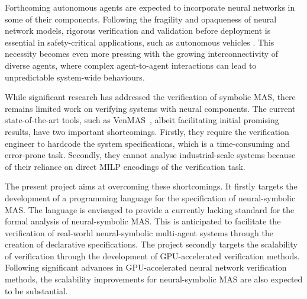 \documentclass[11pt]{article}
\begin{document}
Forthcoming autonomous agents are expected to incorporate
neural networks in some of their components. Following the
fragility and opaqueness of neural network models, rigorous
verification and validation before deployment is essential
in safety-critical applications, such as autonomous
vehicles \cite{Badue+21}. This necessity becomes even more pressing with the
growing interconnectivity of diverse agents, where complex
agent-to-agent interactions can lead to unpredictable
system-wide behaviours.

While significant research has addressed the verification of
symbolic MAS, there remains limited work on
verifying systems with neural components. The current
state-of-the-art tools,  such as {\sc
VenMAS}~\cite{Akintunde+20}, albeit facilitating initial
promising results, have two important shortcomings. Firstly,
they require the verification engineer to  hardcode the
system specifications, which is a time-consuming and
error-prone task. Secondly, they cannot analyse
industrial-scale systems because of their reliance on direct
MILP encodings of the verification task. 

The present project aims at overcoming these shortcomings.
It firstly targets the development of a programming language
for the specification of neural-symbolic MAS. The language
is envisaged to provide a currently lacking standard for the
formal analysis of neural-symbolic MAS. This is anticipated
to facilitate the verification of real-world neural-symbolic
multi-agent systems through the creation of declarative
specifications. The project secondly targets the scalability
of verification through the development of GPU-accelerated
verification methods. Following significant advances in
GPU-accelerated neural network verification methods, 
the scalability improvements for neural-symbolic
MAS are also expected to be substantial.


  


\end{document}
